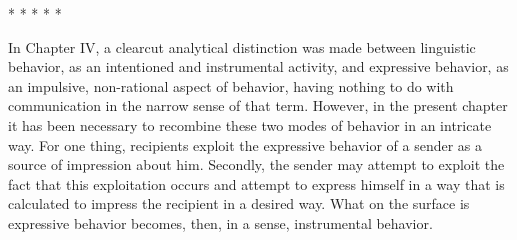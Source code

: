 \documentclass[openany,nobib]{tufte-book}
\begin{document}
\vspace{.2in}
\begin{centering}

\Large{* * * * *}

\end{centering}
\vspace{.17in}

\noindent In Chapter IV, a clearcut analytical distinction was made between
linguistic behavior, as an intentioned and instru­mental activity, and
expressive behavior, as an impulsive, non-rational aspect of behavior,
having nothing to do with communica­tion in the narrow sense of that
term. However, in the present chapter it has been necessary to recombine
these two modes of behavior in an intricate way. For one thing,
recipients exploit the expressive behavior of a sender as a source of
impression about him. Secondly, the sender may attempt to exploit the
fact that this exploitation occurs and attempt to express himself in a
way that is calculated to impress the recipient in a desired way. What
on the surface is expressive behavior becomes, then, in a sense,
instrumental behavior.
\end{document}
